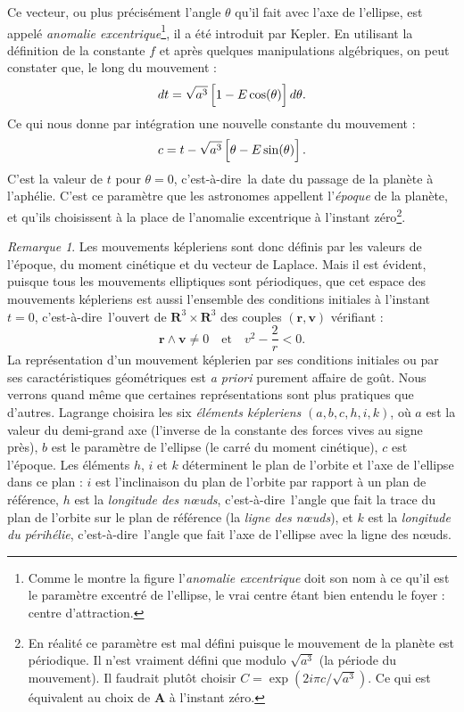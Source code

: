 \documentclass[12pt,paperletter, reqno]{amsart}
\newcommand{\rr}{\mathbf{r}}
\newcommand{\vv}{\mathbf{v}}
\newcommand{\RR}{\mathbf{R}}
\newcommand{\cad}{c'est-\`a-dire}
\theoremstyle{plain}
\theoremstyle{remark}
\newtheorem*{remarque*}{Remarque}
\begin{document}
  Ce vecteur,
  ou plus précisément l'angle $\theta$ qu'il fait avec l'axe de l'ellipse,
  est appelé \emph{anomalie excentrique}\footnote{Comme le montre la figure l'\emph{anomalie excentrique} doit son nom à ce qu'il est le paramètre excentré de l'ellipse, le vrai centre étant bien entendu le foyer : centre d'attraction.},
  il a été introduit par Kepler.
  En utilisant la définition de la constante $f$ et après quelques manipulations algébriques,
  on peut constater que,
  le long du mouvement :
  \begin{equation}
    dt = \sqrt{a^3}\left[\vphantom{\sqrt{a^3}}1-E \cos(\theta)\right] d\theta.
  \end{equation}
  Ce qui nous donne par intégration une nouvelle constante du mouvement :
  \begin{equation}\label{eqKepler}
    c = t - \sqrt{a^3}\left[\vphantom{\sqrt{a^3}}\theta -E \sin(\theta)\right].
  \end{equation}
  C'est la valeur de $t$ pour $\theta =0$,
  \cad\ la date du passage de la planète à l'aphélie.
  C'est ce paramètre que les astronomes appellent l'\emph{époque} de la planète,
  et qu'ils choisissent à la place de l'anomalie excentrique à l'instant zéro\footnote{En réalité ce paramètre est mal défini puisque le mouvement de la planète est périodique. Il n'est vraiment défini que modulo $\sqrt{a^3}$ (la période du mouvement). Il faudrait plutôt choisir $C=\exp(2i\pi c/\sqrt{a^3})$. Ce qui est équivalent au choix de $\mathbf{A}$ à l'instant zéro.}.
  
  \begin{remarque*}
    Les mouvements képleriens sont donc définis par les valeurs de l'époque,
    du moment cinétique et du vecteur de Laplace.
    Mais il est évident,
    puisque tous les mouvements elliptiques sont périodiques,
    que cet espace des mouvements képleriens est aussi l'ensemble des conditions initiales à l'instant $t=0$,
    \cad\ l'ouvert de $\RR^3\times \RR^3$ des couples $(\rr,\vv)$ vérifiant :
    \begin{equation}
      \rr\wedge \vv\neq 0 \quad \mbox{et} \quad v^2 - \frac{2}{r}  <0.
    \end{equation}
    La représentation d'un mouvement képlerien par ses conditions initiales ou par ses caractéristiques géométriques est \emph{a priori} purement affaire de goût.
    Nous verrons quand même que certaines représentations sont plus pratiques que d'autres.
    Lagrange choisira les six \emph{éléments képleriens} $(a,b,c,h,i,k)$,
    où $a$ est la valeur du demi-grand axe (l'inverse de la constante des forces vives au signe près),
    $b$ est le paramètre de l'ellipse (le carré du moment cinétique),
    $c$ est l'époque.
    Les éléments $h$, $i$ et $k$ déterminent le plan de l'orbite et l'axe de l'ellipse dans ce plan :
    $i$ est l'inclinaison du plan de l'orbite par rapport à un plan de référence,
    $h$ est la \emph{longitude des n\oe uds},
    \cad\ l'angle que fait la trace du plan de l'orbite sur le plan de référence (la \emph{ligne des n\oe uds}),
    et $k$ est la \emph{longitude du périhélie},
    \cad\ l'angle que fait l'axe de l'ellipse avec la ligne des n\oe uds.
  \end{remarque*}
  
\end{document}

